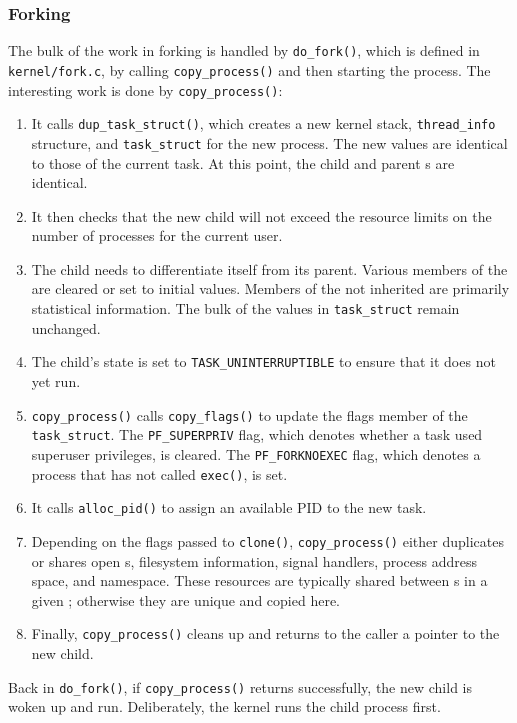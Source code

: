 \subsubsection{Forking}\label{subsubsec:Forking}
The bulk of the work in forking is handled by \texttt{do_fork()}, which is defined in \texttt{kernel/fork.c}, by calling \texttt{copy_process()} and then starting the process.
The interesting work is done by \texttt{copy_process()}:
\begin{enumerate}
\item It calls \texttt{dup_task_struct()}, which creates a new kernel stack, \texttt{thread_info} structure, and \texttt{task_struct} for the new process.
  The new values are identical to those of the current task.
  At this point, the child and parent s are identical.
\item It then checks that the new child will not exceed the resource limits on the number of processes for the current user.
\item The child needs to differentiate itself from its parent.
  Various members of the  are cleared or set to initial values.
  Members of the  not inherited are primarily statistical information.
  The bulk of the values in \texttt{task_struct} remain unchanged.
\item The child’s state is set to \texttt{TASK_UNINTERRUPTIBLE} to ensure that it does not yet run.
\item \texttt{copy_process()} calls \texttt{copy_flags()} to update the flags member of the \texttt{task_struct}.
  The \texttt{PF_SUPERPRIV} flag, which denotes whether a task used superuser privileges, is cleared.
  The \texttt{PF_FORKNOEXEC} flag, which denotes a process that has not called \texttt{exec()}, is set.
\item It calls \texttt{alloc_pid()} to assign an available PID to the new task.
\item Depending on the flags passed to \texttt{clone()}, \texttt{copy_process()} either duplicates or shares open s, filesystem information, signal handlers, process address space, and namespace.
  These resources are typically shared between s in a given ; otherwise they are unique and copied here.
\item Finally, \texttt{copy_process()} cleans up and returns to the caller a pointer to the new child.
\end{enumerate}

Back in \texttt{do_fork()}, if \texttt{copy_process()} returns successfully, the new child is woken up and run.
Deliberately, the kernel runs the child process first.

